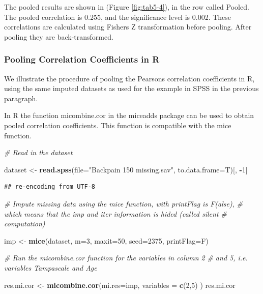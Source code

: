 \documentclass[]{book}
\newenvironment{Shaded}{\begin{snugshade}}{\end{snugshade}}
\newcommand{\KeywordTok}[1]{\textcolor[rgb]{0.13,0.29,0.53}{\textbf{#1}}}
\newcommand{\DataTypeTok}[1]{\textcolor[rgb]{0.13,0.29,0.53}{#1}}
\newcommand{\DecValTok}[1]{\textcolor[rgb]{0.00,0.00,0.81}{#1}}
\newcommand{\StringTok}[1]{\textcolor[rgb]{0.31,0.60,0.02}{#1}}
\newcommand{\CommentTok}[1]{\textcolor[rgb]{0.56,0.35,0.01}{\textit{#1}}}
\newcommand{\OperatorTok}[1]{\textcolor[rgb]{0.81,0.36,0.00}{\textbf{#1}}}
\newcommand{\NormalTok}[1]{#1}
\theoremstyle{definition}
\theoremstyle{definition}
\theoremstyle{definition}
\theoremstyle{remark}
\begin{document}
The pooled results are shown in (Figure \ref{fig:tab5-4}), in the row
called Pooled. The pooled correlation is 0.255, and the significance
level is 0.002. These correlations are calculated using Fishers Z
transformation before pooling. After pooling they are back-transformed.

\subsubsection{Pooling Correlation Coefficients in
R}\label{pooling-correlation-coefficients-in-r}

We illustrate the procedure of pooling the Pearsons correlation
coefficients in R, using the same imputed datasets as used for the
example in SPSS in the previous paragraph.

In R the function micombine.cor in the miceadds package can be used to
obtain pooled correlation coefficients. This function is compatible with
the mice function.

\begin{Shaded}
\begin{Highlighting}[]
\CommentTok{# Read in the dataset }

\NormalTok{dataset <-}\StringTok{ }\KeywordTok{read.spss}\NormalTok{(}\DataTypeTok{file=}\StringTok{"Backpain 150 missing.sav"}\NormalTok{, }\DataTypeTok{to.data.frame=}\NormalTok{T)[, }\OperatorTok{-}\DecValTok{1}\NormalTok{]}
\end{Highlighting}
\end{Shaded}

\begin{verbatim}
## re-encoding from UTF-8
\end{verbatim}

\begin{Shaded}
\begin{Highlighting}[]
\CommentTok{# Impute missing data using the mice function, with printFlag is F(alse), }
\CommentTok{# which means that the imp and iter information is hided (called silent }
\CommentTok{# computation)}

\NormalTok{imp <-}\StringTok{ }\KeywordTok{mice}\NormalTok{(dataset, }\DataTypeTok{m=}\DecValTok{3}\NormalTok{, }\DataTypeTok{maxit=}\DecValTok{50}\NormalTok{, }\DataTypeTok{seed=}\DecValTok{2375}\NormalTok{, }\DataTypeTok{printFlag=}\NormalTok{F)}

\CommentTok{# Run the micombine.cor function for the variables in column 2 }
\CommentTok{# and 5, i.e. variables Tampascale and Age}

\NormalTok{res.mi.cor <-}\StringTok{ }\KeywordTok{micombine.cor}\NormalTok{(}\DataTypeTok{mi.res=}\NormalTok{imp, }\DataTypeTok{variables =} \KeywordTok{c}\NormalTok{(}\DecValTok{2}\NormalTok{,}\DecValTok{5}\NormalTok{) )}
\NormalTok{res.mi.cor}
\end{Highlighting}
\end{Shaded}
\end{document}
